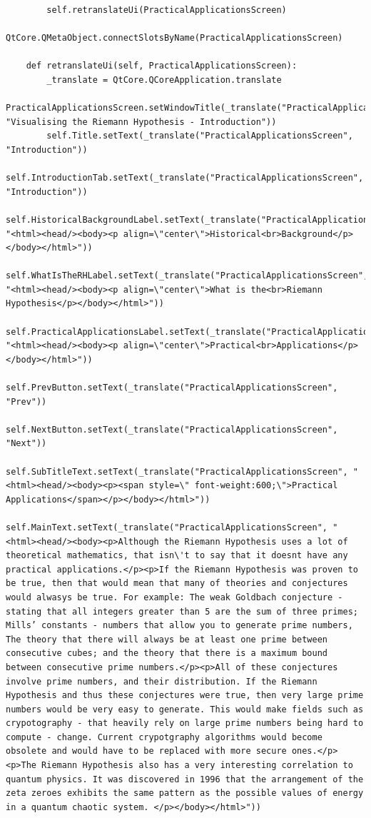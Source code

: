 \documentclass[12pt]{article}
\begin{document}
\begin{lstlisting}
        self.retranslateUi(PracticalApplicationsScreen)
        QtCore.QMetaObject.connectSlotsByName(PracticalApplicationsScreen)

    def retranslateUi(self, PracticalApplicationsScreen):
        _translate = QtCore.QCoreApplication.translate
        PracticalApplicationsScreen.setWindowTitle(_translate("PracticalApplicationsScreen", "Visualising the Riemann Hypothesis - Introduction"))
        self.Title.setText(_translate("PracticalApplicationsScreen", "Introduction"))
        self.IntroductionTab.setText(_translate("PracticalApplicationsScreen", "Introduction"))
        self.HistoricalBackgroundLabel.setText(_translate("PracticalApplicationsScreen", "<html><head/><body><p align=\"center\">Historical<br>Background</p></body></html>"))
        self.WhatIsTheRHLabel.setText(_translate("PracticalApplicationsScreen", "<html><head/><body><p align=\"center\">What is the<br>Riemann Hypothesis</p></body></html>"))
        self.PracticalApplicationsLabel.setText(_translate("PracticalApplicationsScreen", "<html><head/><body><p align=\"center\">Practical<br>Applications</p></body></html>"))
        self.PrevButton.setText(_translate("PracticalApplicationsScreen", "Prev"))
        self.NextButton.setText(_translate("PracticalApplicationsScreen", "Next"))
        self.SubTitleText.setText(_translate("PracticalApplicationsScreen", "<html><head/><body><p><span style=\" font-weight:600;\">Practical Applications</span></p></body></html>"))
        self.MainText.setText(_translate("PracticalApplicationsScreen", "<html><head/><body><p>Although the Riemann Hypothesis uses a lot of theoretical mathematics, that isn\'t to say that it doesnt have any practical applications.</p><p>If the Riemann Hypothesis was proven to be true, then that would mean that many of theories and conjectures would alwasys be true. For example: The weak Goldbach conjecture - stating that all integers greater than 5 are the sum of three primes; Mills’ constants - numbers that allow you to generate prime numbers, The theory that there will always be at least one prime between consecutive cubes; and the theory that there is a maximum bound between consecutive prime numbers.</p><p>All of these conjectures involve prime numbers, and their distribution. If the Riemann Hypothesis and thus these conjectures were true, then very large prime numbers would be very easy to generate. This would make fields such as crypotography - that heavily rely on large prime numbers being hard to compute - change. Current crypotgraphy algorithms would become obsolete and would have to be replaced with more secure ones.</p><p>The Riemann Hypothesis also has a very interesting correlation to quantum physics. It was discovered in 1996 that the arrangement of the zeta zeroes exhibits the same pattern as the possible values of energy in a quantum chaotic system. </p></body></html>"))

\end{lstlisting}
\end{document}
